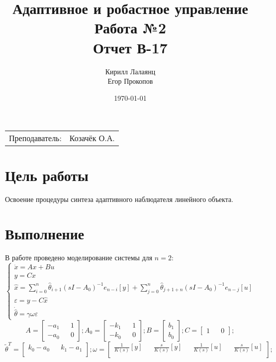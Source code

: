 \documentclass{article}
\title{Адаптивное и робастное управление \\ Работа №2 \\ Отчет В-17} %
\author{Кирилл Лалаянц \\ Егор Прокопов} %
\date{\today} %
\begin{document}
\maketitle %

\begin{center}
\begin{tabular}{l r}
Преподаватель: & Козачёк О.А. %
\end{tabular}
\end{center}
\newpage

\section{Цель работы}

Освоение процедуры синтеза адаптивного наблюдателя
линейного объекта.

\section{Выполнение}
В работе проведено моделирование системы для \(n = 2\):
\[
\begin{cases}
    \dot x = A x + Bu \\
    y = C x \\
    \hat x = \sum_{i=0}^{n}\hat \theta_{i+1} (sI - A_0)^{-1} e_{n-i} [y] + \sum_{j=0}^{n}\hat \theta_{j + 1 + n} (sI - A_0)^{-1} e_{n - j} [u] \\
    \varepsilon = y - C \hat x  \\ 
    \dot {\hat \theta} = \gamma \omega \varepsilon
\end{cases}
\]
\[
  A = \begin{bmatrix}
    -a_1 && 1\\
    -a_0 && 0
  \end{bmatrix};
  A_0 = \begin{bmatrix}
    -k_1 && 1\\
    -k_0 && 0
  \end{bmatrix};
  B = \begin{bmatrix}
    b_1 \\
    b_0
  \end{bmatrix};
  C = \begin{bmatrix}
    1 && 0
  \end{bmatrix};
\]
\[
  \tilde \theta ^ T= \begin{bmatrix}
    k_0 - a_0 && k_1 - a_1\\
  \end{bmatrix};
  \omega = \begin{bmatrix}
    \frac{1}{K(s)}[y] && \frac{s}{K(s)}[y] && \frac{1}{K(s)}[u] && \frac{s}{K(s)}[u]\\
  \end{bmatrix};
\]
\end{document}
